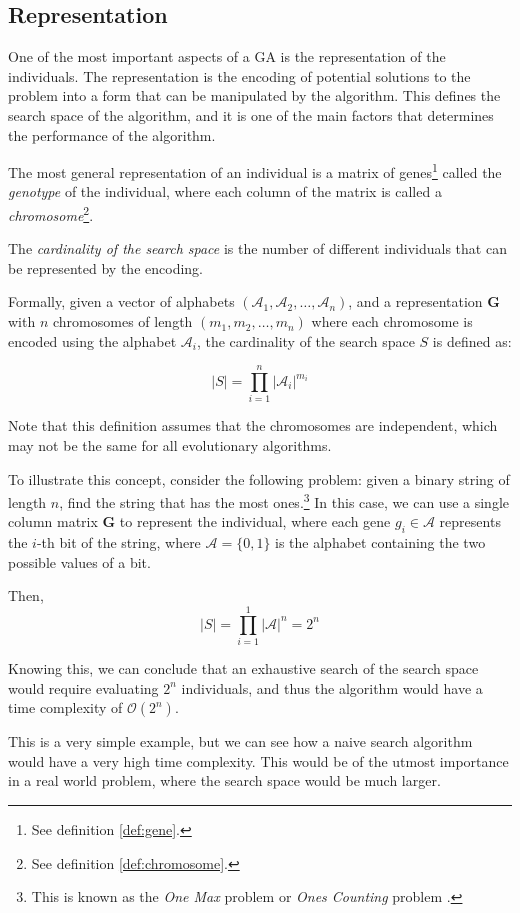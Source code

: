 \subsection{Representation}
\label{ssec:genetic_algorithms:representation}
  One of the most important aspects of a GA is the representation of the individuals.
  The representation is the encoding of potential solutions to the problem into a form that can be
  manipulated by the algorithm.
  This defines the search space of the algorithm, and it is one of the main factors that
  determines the performance of the algorithm.

  The most general representation of an individual is a matrix of genes\footnote{
    See definition \ref{def:gene}.
  } called the \emph{genotype} of the individual, where each column of the matrix is called a
  \emph{chromosome}\footnote{
    See definition \ref{def:chromosome}.
  }.
  
  \begin{definition}
  \label{def:cardinality_of_the_search_space}
    The \emph{cardinality of the search space} is the number of different individuals that 
    can be represented by the encoding.

    Formally, given a vector of alphabets \((\mathcal{A}_1, \mathcal{A}_2, \dots, \mathcal{A}_n)\), 
    and a representation \(\mathbf{G}\) with \(n\) chromosomes of length \((m_1, m_2, \dots, 
    m_n)\) where each chromosome is encoded using the alphabet \(\mathcal{A}_i\), the cardinality 
    of the search space \(S\) is defined as:
    
    \begin{equation}
      \label{eq:cardinality_of_the_search_space}
      |S| = \prod_{i=1}^n |\mathcal{A}_i|^{m_i}
    \end{equation}

    Note that this definition assumes that the chromosomes are independent, which may not be the 
    same for all evolutionary algorithms.
  \end{definition}

  To illustrate this concept, consider the following problem: given a binary string of length
  \(n\), find the string that has the most ones.\footnote{
    This is known as the \emph{One Max} problem \autocite{OneMaxProblema} or \emph{Ones Counting}
    problem \autocite{wilhelmstotterJeneticsJavaGenetica}.
  }
  In this case, we can use a single column matrix \(\mathbf{G}\) to represent the individual, 
  where each gene \(g_i \in \mathcal{A}\) represents the \(i\)-th bit of the string, where 
  \(\mathcal{A} = \{0, 1\}\) is the alphabet containing the two possible values of a bit.
  
  Then,
  \[
    |S| = \prod_{i=1}^1 |\mathcal{A}|^n = 2^n
  \]

  Knowing this, we can conclude that an exhaustive search of the search space would require 
  evaluating \(2^n\) individuals, and thus the algorithm would have a time complexity of 
  \(\mathcal{O}(2^n)\).
  
  This is a very simple example, but we can see how a naive search algorithm would have a very
  high time complexity.
  This would be of the utmost importance in a real world problem, where the search space would be
  much larger.